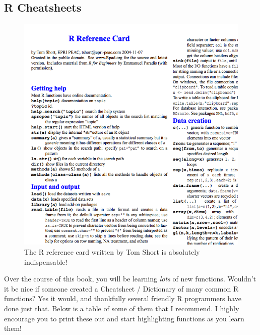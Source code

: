 \documentclass[
]{book}
\begin{document}
\hypertarget{r-cheatsheets}{%
\subsection{R Cheatsheets}\label{r-cheatsheets}}

\begin{figure}

{\centering \includegraphics[width=0.75\linewidth]{images/rreferencess} 

}

\caption{The R reference card written by Tom Short is absolutely indispensable!}\label{fig:rreferencecard}
\end{figure}

Over the course of this book, you will be learning \emph{lots} of new functions. Wouldn't it be nice if someone created a Cheatsheet / Dictionary of many common R functions? Yes it would, and thankfully several friendly R programmers have done just that. Below is a table of some of them that I recommend. I highly encourage you to print these out and start highlighting functions as you learn them!
\end{document}

